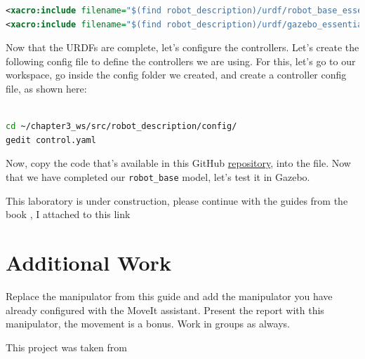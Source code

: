 \documentclass[letterpaper,pdftex]{article}
\begin{document}
\begin{lstlisting}[language=xml]
<xacro:include filename="$(find robot_description)/urdf/robot_base_essentials.xacro" />
<xacro:include filename="$(find robot_description)/urdf/gazebo_essentials_base.xacro" />
\end{lstlisting}

Now that the URDFs are complete, let's configure the controllers. Let's create the following config file to define the controllers we are using. For this, let's go to our workspace, go inside the config folder we created, and create a controller config file, as shown here:

\begin{lstlisting}[language=bash]

cd ~/chapter3_ws/src/robot_description/config/
gedit control.yaml

\end{lstlisting}

Now, copy the code that's available in this GitHub \href{https://github.com/nikorose87/robotics_labs/blob/main/Lab2/Resources/config/control.yaml}{repository}, into the file. Now that we have completed our \verb|robot_base| model, let's test it in Gazebo.

This laboratory is under construction, please continue with the guides from the book \citep{Gandhinathan2020}, I attached to this link


\section{Additional Work}

Replace the manipulator from this guide and add the manipulator you have already configured with the MoveIt assistant. Present the report with this manipulator, the movement is a bonus. Work in groups as always.

This project was taken from \cite{Gandhinathan2020}


\end{document}
